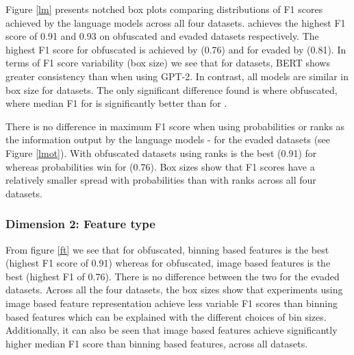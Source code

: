 %
Figure \ref{lm} presents notched box plots comparing distributions of F1 scores achieved by the language models across all four datasets.
%
\bertlarge achieves the highest F1 score of 0.91 and 0.93 on \amt obfuscated and evaded datasets respectively.
%
The highest F1 score for \blogs obfuscated is achieved by \bertsmall (0.76) and for \blogs evaded by \gptlarge (0.81).
%
In terms of F1 score variability (box size) we see that for \amt datasets, BERT shows greater consistency than when using GPT-2.
%
In contrast, all models are similar in box size for \blogs datasets.
%
The only significant difference found is where \amt obfuscated, where median F1 for \bertlarge is significantly better than for \gptsmall.
%
%

There is no difference in maximum F1 score when using probabilities or ranks as the information output by the language models - for the evaded datasets (see Figure \ref{lmot}).
%
With obfuscated datasets using ranks is the best (0.91) for \amt whereas probabilities win for \blogs (0.76).
%
Box sizes show that F1 scores have a relatively smaller spread with probabilities than with ranks across all four datasets.

\subsubsection{Dimension 2: Feature type}
%
%
From figure \ref{ft} we see that 
for \amt obfuscated, binning based features is the best (highest F1 score of 0.91) whereas for \blogs obfuscated, image based features is the best (highest F1  of 0.76).
%
There is no difference between the two for the evaded datasets.
%
Across all the four datasets, the box sizes show that experiments using image based feature representation achieve less variable F1 scores than binning based features which can be explained with the different choices of bin sizes.
%
Additionally, it can also be seen that image based features achieve significantly higher median F1 score than binning based features, across all datasets.

